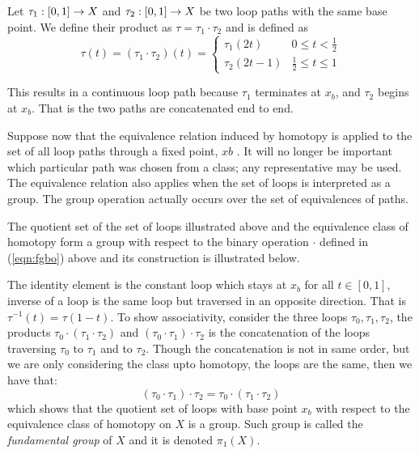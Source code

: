 Let $\tau_1 : [0,1] \rightarrow X$ and $\tau_2 : [0,1] \rightarrow X$ be two loop paths with the same base point. We define their product as $\tau = \tau_1 \cdot \tau_2$ and is defined as
\begin{equation}\label{eqn:fgbo}
    \tau(t) = (\tau_1 \cdot \tau_2)(t) = \begin{cases}
        \tau_1(2t) & 0 \le t < \frac12 \\
        \tau_2(2t - 1) & \frac12 \le t \le 1
    \end{cases}  
\end{equation}

This results in a continuous loop path because $\tau_1$ terminates at $x_b$, and $\tau_2$ begins at $x_b$. That is the two paths are concatenated end to end.

Suppose now that the equivalence relation induced by homotopy is applied to the set of all loop paths through a fixed point, $xb$ . It will no longer be important which particular path was chosen from a class; any representative may be used. The equivalence relation also applies when the set of loops is interpreted as a group. The group operation actually occurs over the set of equivalences of paths.

The quotient set of the set of loops illustrated above and the equivalence class of homotopy form a group with respect to the binary operation $\cdot$ defined in (\ref{eqn:fgbo}) above and its construction is illustrated below. 

The identity element is the constant loop which stays at $x_b$ for all $t \in [0,1]$, inverse of a loop is the same loop but traversed in an opposite direction. That is $\tau^{-1}(t) = \tau(1-t)$. To show associativity, consider the three loops $\tau_0, \tau_1,\tau_2$, the products $\tau_0 \cdot (\tau_1 \cdot \tau_2)$ and $(\tau_0 \cdot \tau_1) \cdot \tau_2$ is the concatenation of the loops traversing $\tau_0$ to $\tau_1$ and to $\tau_2$. Though the concatenation is not in same order, but we are only considering the class upto homotopy, the loops are the same, then we have that:
\[
    (\tau_0 \cdot \tau_1) \cdot \tau_2 = \tau_0 \cdot (\tau_1 \cdot \tau_2)
\]
which shows that the quotient set of loops with base point $x_b$ with respect to the equivalence class of homotopy on $X$ is a group. Such group is called the \textit{fundamental group} of $X$ and it is denoted $\pi_1(X)$.

